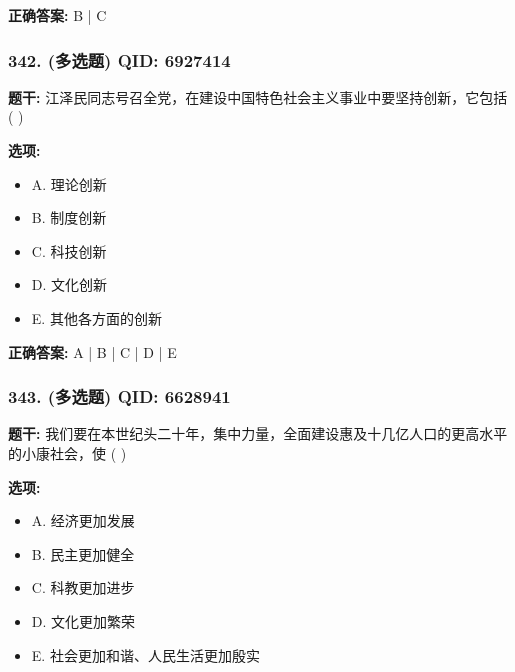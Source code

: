 \documentclass[12pt,UTF8]{ctexart}
\begin{document}
\textbf{正确答案:}
B | C

\vspace{0.3em}\hrulefill\vspace{0.7em}

\subsubsection*{342. (多选题) \small QID: 6927414}

\textbf{题干:}
江泽民同志号召全党，在建设中国特色社会主义事业中要坚持创新，它包括( )

\textbf{选项:}
\begin{itemize}[leftmargin=*]

  \item A. 理论创新

  \item B. 制度创新

  \item C. 科技创新

  \item D. 文化创新

  \item E. 其他各方面的创新

\end{itemize}

\textbf{正确答案:}
A | B | C | D | E

\vspace{0.3em}\hrulefill\vspace{0.7em}

\subsubsection*{343. (多选题) \small QID: 6628941}

\textbf{题干:}
我们要在本世纪头二十年，集中力量，全面建设惠及十几亿人口的更高水平的小康社会，使  ( )

\textbf{选项:}
\begin{itemize}[leftmargin=*]

  \item A. 经济更加发展

  \item B. 民主更加健全

  \item C. 科教更加进步

  \item D. 文化更加繁荣

  \item E. 社会更加和谐、人民生活更加殷实

\end{itemize}
\end{document}
